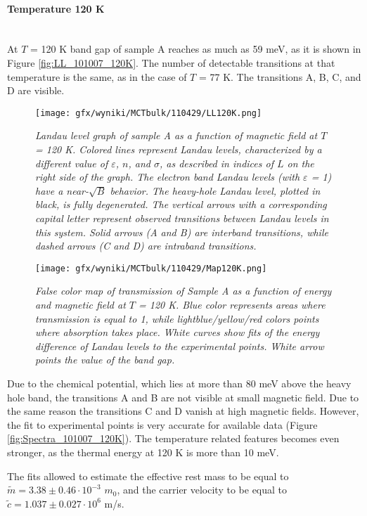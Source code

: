 \documentclass[titlepage,a4paper]{book}
\newcommand{\wciecie}{\quad\phantom{v}}
\newcommand{\myparagraph}[1]{\paragraph{#1}\mbox{}\\}
\begin{document}
\clearpage
\myparagraph{Temperature 120 K}
\wciecie
At $T$ = 120 K band gap of sample A reaches as much as 59 meV, as it is shown in Figure \ref{fig:LL_101007_120K}. The number of detectable transitions at that temperature is the same, as in the case of $T$ = 77 K. The transitions A, B, C, and D are visible.  
\begin{figure}[ht]
	\centering
	\texttt{[image: gfx/wyniki/MCTbulk/110429/LL120K.png]}
	\vspace{-10pt}
	\caption{\textit{Landau level graph of sample A as a function of magnetic field at $T$ = 120 K. Colored lines represent Landau levels, characterized by a different value of $\varepsilon$, $n$, and $\sigma$, as described in indices of $L$ on the right side of the graph. The electron band Landau levels (with $\varepsilon$ = 1) have a near-$\sqrt{B}$ behavior. The heavy-hole Landau level, plotted in black, is fully degenerated. The vertical arrows with a corresponding capital letter represent observed transitions between Landau levels in this system. Solid arrows (A and B) are interband transitions, while dashed arrows (C and D) are intraband transitions.}}
	\label{fig:LL_110429_120K}
\end{figure}

\begin{figure}[ht]
	\centering
	\texttt{[image: gfx/wyniki/MCTbulk/110429/Map120K.png]}
	\vspace{-10pt}
	\caption{\textit{False color map of transmission of Sample A as a function of energy and magnetic field at $T$ = 120 K. Blue color represents areas where transmission is equal to 1, while lightblue/yellow/red colors points where absorption takes place. White curves show fits of the energy difference of Landau levels to the experimental points. White arrow points the value of the band gap.}}
	\label{fig:Map_110429_120K}
\end{figure} 
Due to the chemical potential, which lies at more than 80 meV above the heavy hole band, the transitions A and B are not visible at small magnetic field. Due to the same reason the transitions C and D vanish at high magnetic fields. However, the fit to experimental points is very accurate for available data (Figure \ref{fig:Spectra_101007_120K}). The temperature related features becomes even stronger, as the thermal energy at 120 K is more than 10 meV.

The fits allowed to estimate the effective rest mass to be equal to $\tilde m = 3.38 \pm 0.46 \cdot 10^{-3}$ $m_0$, and the carrier velocity to be equal to $\tilde{c} = 1.037 \pm 0.027 \cdot 10^6$ m/s. 
\end{document}
